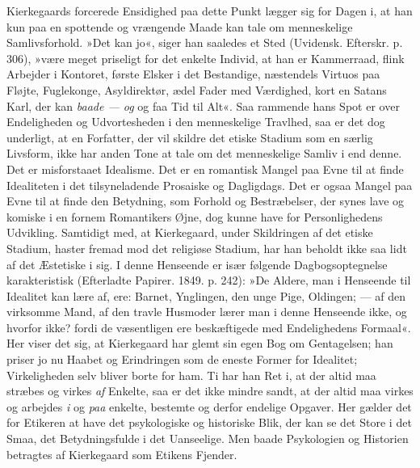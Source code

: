 \documentclass[12pt,a4paper,openany]{book}
\newcommand{\opage}[1]{\marginnote{\footnotesize\textit{[#1]}}}
\begin{document}
Kierkegaards forcerede Ensidighed paa dette Punkt
lægger sig for Dagen i, at han kun paa en spottende og
vrængende Maade kan tale om menneskelige Samlivsforhold.
»Det kan jo«, siger han saaledes et Sted (Uvidensk.
Efterskr. p. 306), »være meget priseligt for det enkelte
Individ, at han er Kammerraad, flink Arbejder i Kontoret,
første Elsker i det Bestandige, næstendels Virtuos
paa Fløjte, Fuglekonge, Asyldirektør, ædel Fader med
Værdighed, kort en Satans Karl, der kan \textit{baade --- og}
og faa Tid til Alt«. Saa rammende hans Spot er over
Endeligheden og Udvortesheden i den menneskelige Travlhed,
saa er det dog underligt, at en Forfatter, der vil
skildre det etiske Stadium som en særlig Livsform, ikke
har anden Tone at tale om det menneskelige Samliv i
end denne. Det er misforstaaet Idealisme. Det er en
romantisk Mangel paa Evne til at finde Idealiteten i det
tilsyneladende Prosaiske og Dagligdags. Det er ogsaa
Mangel paa Evne til at finde den Betydning, som Forhold
og Bestræbelser, der synes lave og komiske i en
fornem Romantikers Øjne, dog kunne have for Personlighedens
Udvikling. Samtidigt med, at Kierkegaard, under
Skildringen af det etiske Stadium, haster fremad mod
det religiøse Stadium, har han beholdt ikke saa lidt af
det Æstetiske i sig. I denne Henseende er især følgende
Dagbogsoptegnelse karakteristisk (Efterladte Papirer. 1849.
p. 242): »De Aldere, man i Henseende til Idealitet kan
lære af, ere: Barnet, Ynglingen, den unge Pige, Oldingen;
--- af den virksomme Mand, af den travle Husmoder
\opage{107}lærer man i denne Henseende ikke, og hvorfor ikke?
fordi de væsentligen ere beskæftigede med Endelighedens
Formaal«. Her viser det sig, at Kierkegaard har glemt
sin egen Bog om Gentagelsen; han priser jo nu Haabet
og Erindringen som de eneste Former for Idealitet; Virkeligheden
selv bliver borte for ham. Ti har han Ret i,
at der altid maa stræbes og virkes \textit{af} Enkelte, saa er
det ikke mindre sandt, at der altid maa virkes og arbejdes
\textit{i} og \textit{paa} enkelte, bestemte og derfor endelige Opgaver.
Her gælder det for Etikeren at have det psykologiske og
historiske Blik, der kan se det Store i det Smaa, det
Betydningsfulde i det Uanseelige. Men baade Psykologien
og Historien betragtes af Kierkegaard som Etikens
Fjender.
\end{document}
